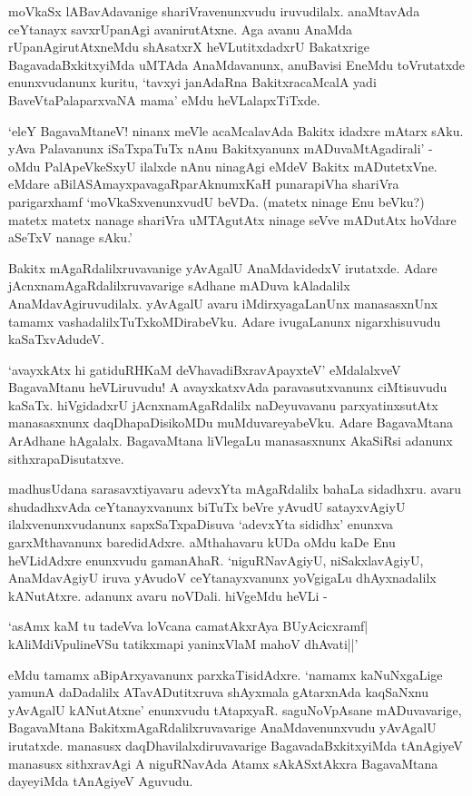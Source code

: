 moVkaSx lABavAdavanige shariVravenunxvudu iruvudilalx. anaMtavAda ceYtanayx savxrUpanAgi avanirutAtxne. Aga avanu AnaMda rUpanAgirutAtxneMdu 
shAsatxrX heVLutitxdadxrU Bakatxrige BagavadaBxkitxyiMda uMTAda AnaMdavanunx, anuBavisi EneMdu toVrutatxde enunxvudanunx kuritu, 
`tavxyi janAdaRna BakitxracaMcalA yadi BaveVtaPalaparxvaNA mama' eMdu heVLalapxTiTxde.

`eleY BagavaMtaneV! ninanx meVle acaMcalavAda Bakitx idadxre mAtarx sAku. yAva Palavanunx iSaTxpaTuTx nAnu Bakitxyanunx mADuvaMtAgadirali' - oMdu 
PalApeVkeSxyU ilalxde nAnu ninagAgi eMdeV Bakitx mADutetxVne. eMdare 
aBilASAmayxpavagaRparAknumxKaH punarapiVha shariVra parigarxhamf `moVkaSxvenunxvudU beVDa. (matetx ninage Enu beVku?) matetx matetx nanage shariVra uMTAgutAtx ninage seVve mADutAtx hoVdare aSeTxV nanage sAku.'

Bakitx mAgaRdalilxruvavanige yAvAgalU AnaMdavidedxV irutatxde. Adare jAcnxnamAgaRdalilxruvavarige sAdhane mADuva kAladalilx AnaMdavAgiruvudilalx. 
yAvAgalU avaru iMdirxyagaLanUnx manasasxnUnx tamamx vashadalilxTuTxkoMDirabeVku. Adare ivugaLanunx nigarxhisuvudu kaSaTxvAdudeV.

`avayxkAtx hi gatiduRHKaM deVhavadiBxravApayxteV' eMdalalxveV BagavaMtanu heVLiruvudu! A avayxkatxvAda paravasutxvanunx ciMtisuvudu kaSaTx. hiVgidadxrU jAcnxnamAgaRdalilx 
naDeyuvavanu parxyatinxsutAtx manasasxnunx daqDhapaDisikoMDu muMduvareyabeVku. Adare BagavaMtana ArAdhane hAgalalx. 
BagavaMtana liVlegaLu manasasxnunx AkaSiRsi adanunx sithxrapaDisutatxve.

madhusUdana sarasavxtiyavaru adevxYta mAgaRdalilx bahaLa sidadhxru. avaru shudadhxvAda ceYtanayxvanunx biTuTx beVre yAvudU satayxvAgiyU ilalxvenunxvudanunx 
sapxSaTxpaDisuva `adevxYta sididhx' enunxva garxMthavanunx baredidAdxre. aMthahavaru kUDa oMdu kaDe Enu heVLidAdxre enunxvudu gamanAhaR. `niguRNavAgiyU, 
niSakxlavAgiyU, AnaMdavAgiyU iruva yAvudoV ceYtanayxvanunx yoVgigaLu dhAyxnadalilx kANutAtxre. adanunx avaru noVDali. hiVgeMdu heVLi -

\begin{shloka}
`asAmx kaM tu tadeVva loVcana camatAkxrAya BUyAcicxramf|\\
kAliMdiVpulineVSu tatikxmapi yaninxVlaM mahoV dhAvati||'
\end{shloka}

\noindent eMdu tamamx aBipArxyavanunx parxkaTisidAdxre. `namamx kaNuNxgaLige yamunA daDadalilx ATavADutitxruva shAyxmala gAtarxnAda kaqSaNxnu yAvAgalU kANutAtxne' enunxvudu 
tAtapxyaR. saguNoVpAsane mADuvavarige, BagavaMtana BakitxmAgaRdalilxruvavarige AnaMdavenunxvudu yAvAgalU irutatxde. manasusx daqDhavilalxdiruvavarige 
BagavadaBxkitxyiMda tAnAgiyeV manasusx sithxravAgi A niguRNavAda Atamx sAkASxtAkxra BagavaMtana dayeyiMda tAnAgiyeV Aguvudu.

